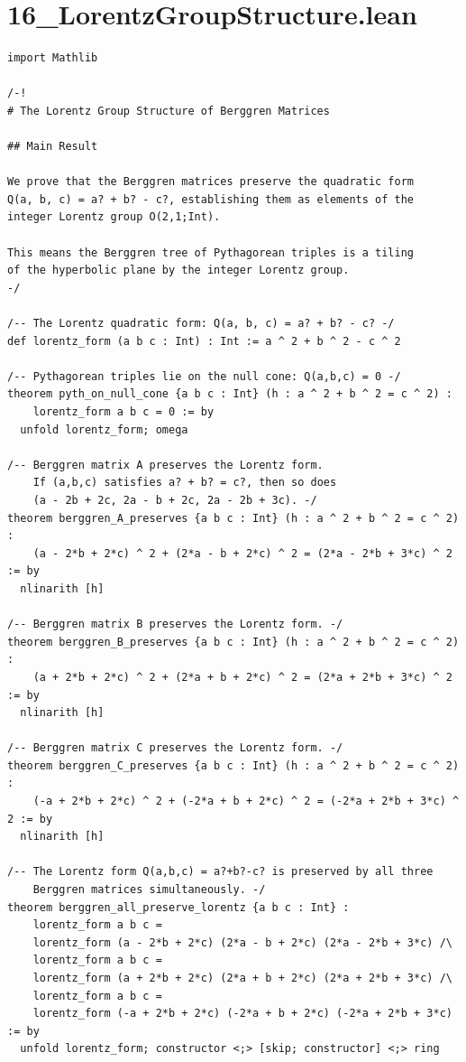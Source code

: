 \documentclass[11pt,twoside,openright]{book}
\theoremstyle{definition}
\theoremstyle{remark}
\begin{document}
\section*{16\_LorentzGroupStructure.lean}

\begin{lstlisting}[style=lean]
import Mathlib

/-!
# The Lorentz Group Structure of Berggren Matrices

## Main Result

We prove that the Berggren matrices preserve the quadratic form
Q(a, b, c) = a? + b? - c?, establishing them as elements of the
integer Lorentz group O(2,1;Int).

This means the Berggren tree of Pythagorean triples is a tiling
of the hyperbolic plane by the integer Lorentz group.
-/

/-- The Lorentz quadratic form: Q(a, b, c) = a? + b? - c? -/
def lorentz_form (a b c : Int) : Int := a ^ 2 + b ^ 2 - c ^ 2

/-- Pythagorean triples lie on the null cone: Q(a,b,c) = 0 -/
theorem pyth_on_null_cone {a b c : Int} (h : a ^ 2 + b ^ 2 = c ^ 2) :
    lorentz_form a b c = 0 := by
  unfold lorentz_form; omega

/-- Berggren matrix A preserves the Lorentz form.
    If (a,b,c) satisfies a? + b? = c?, then so does
    (a - 2b + 2c, 2a - b + 2c, 2a - 2b + 3c). -/
theorem berggren_A_preserves {a b c : Int} (h : a ^ 2 + b ^ 2 = c ^ 2) :
    (a - 2*b + 2*c) ^ 2 + (2*a - b + 2*c) ^ 2 = (2*a - 2*b + 3*c) ^ 2 := by
  nlinarith [h]

/-- Berggren matrix B preserves the Lorentz form. -/
theorem berggren_B_preserves {a b c : Int} (h : a ^ 2 + b ^ 2 = c ^ 2) :
    (a + 2*b + 2*c) ^ 2 + (2*a + b + 2*c) ^ 2 = (2*a + 2*b + 3*c) ^ 2 := by
  nlinarith [h]

/-- Berggren matrix C preserves the Lorentz form. -/
theorem berggren_C_preserves {a b c : Int} (h : a ^ 2 + b ^ 2 = c ^ 2) :
    (-a + 2*b + 2*c) ^ 2 + (-2*a + b + 2*c) ^ 2 = (-2*a + 2*b + 3*c) ^ 2 := by
  nlinarith [h]

/-- The Lorentz form Q(a,b,c) = a?+b?-c? is preserved by all three
    Berggren matrices simultaneously. -/
theorem berggren_all_preserve_lorentz {a b c : Int} :
    lorentz_form a b c =
    lorentz_form (a - 2*b + 2*c) (2*a - b + 2*c) (2*a - 2*b + 3*c) /\
    lorentz_form a b c =
    lorentz_form (a + 2*b + 2*c) (2*a + b + 2*c) (2*a + 2*b + 3*c) /\
    lorentz_form a b c =
    lorentz_form (-a + 2*b + 2*c) (-2*a + b + 2*c) (-2*a + 2*b + 3*c) := by
  unfold lorentz_form; constructor <;> [skip; constructor] <;> ring


\end{lstlisting}
\end{document}
